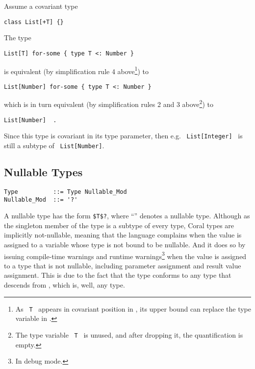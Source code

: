 \example Assume a covariant type
\begin{lstlisting}
class List[+T] {}
\end{lstlisting}

The type 
\begin{lstlisting}
List[T] for-some { type T <: Number }
\end{lstlisting}

is equivalent (by simplification rule 4 above\footnote{As ~\lstinline!T!~ appears in covariant position in , its upper bound can replace the type variable in .}) to
\begin{lstlisting}
List[Number] for-some { type T <: Number }
\end{lstlisting}

which is in turn equivalent (by simplification rules 2 and 3 above\footnote{The type variable ~\lstinline!T!~ is unused, and after dropping it, the quantification is empty.}) to
\begin{lstlisting}
List[Number]  .
\end{lstlisting}

Since this  type is covariant in its type parameter, then e.g. ~\lstinline!List[Integer]!~ is still a subtype of ~\lstinline!List[Number]!. 





\subsection{Nullable Types}
\label{sec:nullable-types}

\syntax\begin{lstlisting}
Type          ::= Type Nullable_Mod
Nullable_Mod  ::= '?'
\end{lstlisting}

A nullable type has the form \lstinline!$T$?!, where ``'' denotes a nullable type. Although  as the singleton member of the  type is a subtype of every type, Coral types are implicitly not-nullable, meaning that the language complains when the  value is assigned to a variable whose type is not bound to be nullable. And it does so by issuing compile-time warnings and runtime warnings\footnote{In debug mode.} when the  value is assigned to a type that is not nullable, including parameter assignment and result value assignment. This is due to the fact that the type  conforms to any type that descends from , which is, well, any type. 

